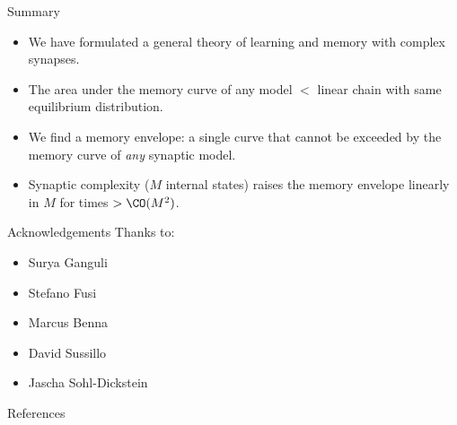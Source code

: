 \documentclass{beamer}%
\begin{document}

\begin{frame}{Summary}
%
  \begin{itemize}
    \item We have formulated a general theory of learning and memory with complex synapses.
    \item The area under the memory curve of any model $<$ linear chain with same equilibrium distribution.
    \item We find a memory envelope: a single curve that cannot be exceeded by the memory curve of \emph{any} synaptic model.
    \item Synaptic complexity ($M$ internal states) raises the memory envelope linearly in $M$ for times $> \CO(M^2)$.
  \end{itemize}

%
\end{frame}





%
%
%

\begin{frame}{Acknowledgements}
%
 Thanks to:
 \begin{itemize}
   \item Surya Ganguli
   \item Stefano Fusi
   \item Marcus Benna
   \item David Sussillo
   \item Jascha Sohl-Dickstein
 \end{itemize}
%
\end{frame}


\begin{frame}[allowframebreaks]{References}
%

 {\small
 
 
 }
%
\end{frame}
\end{document}
